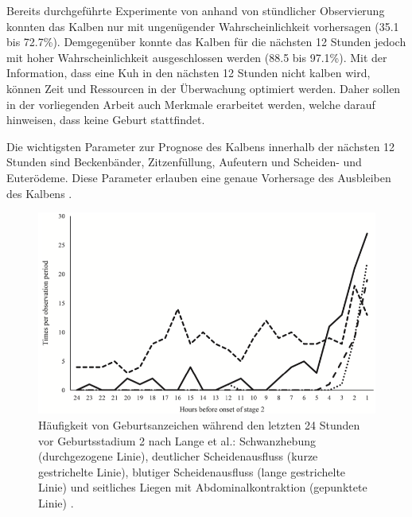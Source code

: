 Bereits durchgeführte Experimente von \citep[S. 4847]{Lange2017} anhand von stündlicher Observierung konnten das Kalben nur mit ungenügender Wahrscheinlichkeit  vorhersagen (35.1 bis 72.7\%). Demgegenüber konnte das Kalben für die nächsten 12 Stunden jedoch mit hoher Wahrscheinlichkeit ausgeschlossen werden (88.5 bis 97.1\%). Mit der Information, dass eine Kuh in den nächsten 12 Stunden nicht kalben wird, können Zeit und Ressourcen in der Überwachung optimiert werden. Daher sollen in der vorliegenden Arbeit auch Merkmale erarbeitet werden, welche darauf hinweisen, dass keine Geburt stattfindet.

Die wichtigsten Parameter zur Prognose des Kalbens innerhalb der nächsten 12 Stunden sind Beckenbänder, Zitzenfüllung,  Aufeutern und Scheiden- und Euterödeme. Diese Parameter erlauben eine genaue Vorhersage des Ausbleiben des Kalbens \citep[S. 180]{Streyl2011}.



\begin{figure}[H]
	\center
	\includegraphics[scale=.45]{Grafiken/observationTimes.png}
	\caption{Häufigkeit von Geburtsanzeichen während den letzten 24 Stunden vor Geburtsstadium 2 nach Lange et al.: Schwanzhebung (durchgezogene Linie), deutlicher Scheidenausfluss (kurze gestrichelte Linie), blutiger Scheidenausfluss (lange gestrichelte Linie) und seitliches Liegen mit Abdominalkontraktion (gepunktete Linie) \citep[S. 4851]{Lange2017}.}
	\label{fig: Häufigkeit von Geburtsanzeichen }
\end{figure}


